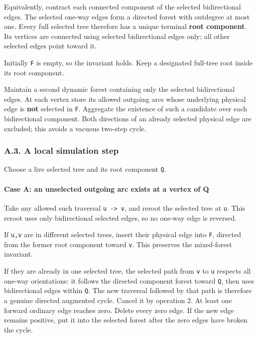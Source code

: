 Equivalently, contract each connected component of the selected bidirectional edges. The selected one-way edges form a directed forest with outdegree at most one. Every full selected tree therefore has a unique terminal \textbf{root component}. Its vertices are connected using selected bidirectional edges only; all other selected edges point toward it.

Initially \texttt{F} is empty, so the invariant holds. Keep a designated full-tree root inside its root component.

Maintain a second dynamic forest containing only the selected bidirectional edges. At each vertex store its allowed outgoing arcs whose underlying physical edge is \textbf{not} selected in \texttt{F}. Aggregate the existence of such a candidate over each bidirectional component. Both directions of an already selected physical edge are excluded; this avoids a vacuous two-step cycle.

\hypertarget{af-385fd70686-a.3.-a-local-simulation-step}{%
\subsubsection{A.3. A local simulation step}\label{af-385fd70686-a.3.-a-local-simulation-step}}

Choose a live selected tree and its root component \texttt{Q}.

\hypertarget{af-385fd70686-case-a-an-unselected-outgoing-arc-exists-at-a-vertex-of-q}{%
\paragraph{Case A: an unselected outgoing arc exists at a vertex of Q}\label{af-385fd70686-case-a-an-unselected-outgoing-arc-exists-at-a-vertex-of-q}}

Take any allowed such traversal \texttt{u\ -\textgreater{}\ v}, and reroot the selected tree at \texttt{u}. This reroot uses only bidirectional selected edges, so no one-way edge is reversed.

If \texttt{u,v} are in different selected trees, insert their physical edge into \texttt{F}, directed from the former root component toward \texttt{v}. This preserves the mixed-forest invariant.

If they are already in one selected tree, the selected path from \texttt{v} to \texttt{u} respects all one-way orientations: it follows the directed component forest toward \texttt{Q}, then uses bidirectional edges within \texttt{Q}. The new traversal followed by that path is therefore a genuine directed augmented cycle. Cancel it by operation 2. At least one forward ordinary edge reaches zero. Delete every zero edge. If the new edge remains positive, put it into the selected forest after the zero edges have broken the cycle.

